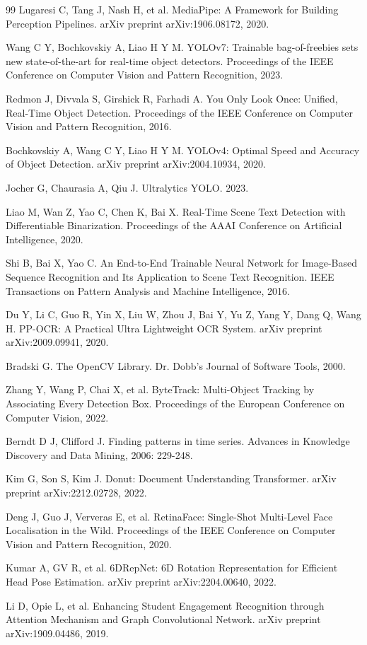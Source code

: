 \documentclass[12pt,hyperref,a4paper,UTF8]{ctexart}
\begin{document}
\begin{thebibliography}{99}
 Lugaresi C, Tang J, Nash H, et al. MediaPipe: A Framework for Building Perception Pipelines. arXiv preprint arXiv:1906.08172, 2020.

 Wang C Y, Bochkovskiy A, Liao H Y M. YOLOv7: Trainable bag-of-freebies sets new state-of-the-art for real-time object detectors. Proceedings of the IEEE Conference on Computer Vision and Pattern Recognition, 2023.

 Redmon J, Divvala S, Girshick R, Farhadi A. You Only Look Once: Unified, Real-Time Object Detection. Proceedings of the IEEE Conference on Computer Vision and Pattern Recognition, 2016.

 Bochkovskiy A, Wang C Y, Liao H Y M. YOLOv4: Optimal Speed and Accuracy of Object Detection. arXiv preprint arXiv:2004.10934, 2020.

 Jocher G, Chaurasia A, Qiu J. Ultralytics YOLO. 2023.

 Liao M, Wan Z, Yao C, Chen K, Bai X. Real-Time Scene Text Detection with Differentiable Binarization. Proceedings of the AAAI Conference on Artificial Intelligence, 2020.

 Shi B, Bai X, Yao C. An End-to-End Trainable Neural Network for Image-Based Sequence Recognition and Its Application to Scene Text Recognition. IEEE Transactions on Pattern Analysis and Machine Intelligence, 2016.

 Du Y, Li C, Guo R, Yin X, Liu W, Zhou J, Bai Y, Yu Z, Yang Y, Dang Q, Wang H. PP-OCR: A Practical Ultra Lightweight OCR System. arXiv preprint arXiv:2009.09941, 2020.

 Bradski G. The OpenCV Library. Dr. Dobb's Journal of Software Tools, 2000.

 Zhang Y, Wang P, Chai X, et al. ByteTrack: Multi-Object Tracking by Associating Every Detection Box. Proceedings of the European Conference on Computer Vision, 2022.

 Berndt D J, Clifford J. Finding patterns in time series. Advances in Knowledge Discovery and Data Mining, 2006: 229-248.

 Kim G, Son S, Kim J. Donut: Document Understanding Transformer. arXiv preprint arXiv:2212.02728, 2022.

 Deng J, Guo J, Ververas E, et al. RetinaFace: Single-Shot Multi-Level Face Localisation in the Wild. Proceedings of the IEEE Conference on Computer Vision and Pattern Recognition, 2020.

 Kumar A, GV R, et al. 6DRepNet: 6D Rotation Representation for Efficient Head Pose Estimation. arXiv preprint arXiv:2204.00640, 2022.

 Li D, Opie L, et al. Enhancing Student Engagement Recognition through Attention Mechanism and Graph Convolutional Network. arXiv preprint arXiv:1909.04486, 2019.
\end{thebibliography}
\end{document}
